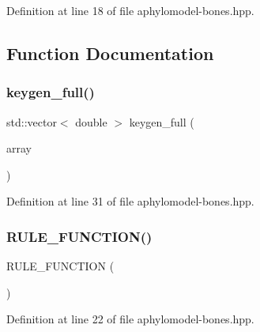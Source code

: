 Definition at line 18 of file aphylomodel-\/bones.\+hpp.



\subsection{Function Documentation}
\mbox{\label{aphylomodel-bones_8hpp_aa60134cca317d64e4b3d1707380d5d0d}} 
\subsubsection{\texorpdfstring{keygen\+\_\+full()}{keygen\_full()}}
{\footnotesize\ttfamily std\+::vector$<$ double $>$ keygen\+\_\+full (\begin{DoxyParamCaption}\item[{const \hyperlink{namespacebarry_1_1counters_1_1phylo_abd293bf65e494e903639fb5fb2c91604}{phylocounters\+::\+Phylo\+Array} \&}]{array }\end{DoxyParamCaption})\hspace{0.3cm}{\ttfamily [inline]}}



Definition at line 31 of file aphylomodel-\/bones.\+hpp.

\mbox{\label{aphylomodel-bones_8hpp_a11c7dd7dca27f32547bb602f30ceb5e8}} 
\subsubsection{\texorpdfstring{R\+U\+L\+E\+\_\+\+F\+U\+N\+C\+T\+I\+O\+N()}{RULE\_FUNCTION()}}
{\footnotesize\ttfamily R\+U\+L\+E\+\_\+\+F\+U\+N\+C\+T\+I\+ON (\begin{DoxyParamCaption}\item[{rule\+\_\+empty\+\_\+free}]{ }\end{DoxyParamCaption})}



Definition at line 22 of file aphylomodel-\/bones.\+hpp.

